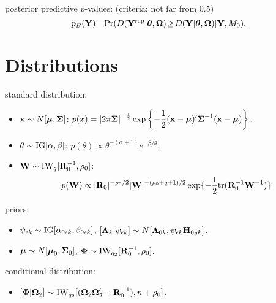 posterior predictive $p$-values: (criteria: not far from $0.5$)
\vspace{1ex}
\[p_B(\mathbf{Y}) \!=\! \text{Pr}(D(\mathbf{Y}^{\text{rep}} \vert \boldsymbol{\theta}, \boldsymbol{\Omega}) \!\geq\! D(\mathbf{Y} \vert \boldsymbol{\theta}, \boldsymbol{\Omega}) \vert \mathbf{Y}, M_0).\]







\section*{Distributions}

standard distribution: \begin{itemize}
    \item $\mathbf{x} \sim {N}[\boldsymbol{\mu}, \boldsymbol{\Sigma}]$: $
        \displaystyle p(x) = |2\pi\boldsymbol{\Sigma}|^{-\frac{1}{2}} \exp\left\{ -\frac{1}{2} (\mathbf{x} - \boldsymbol{\mu})' \boldsymbol{\Sigma}^{-1} (\mathbf{x} - \boldsymbol{\mu})\right\}.
    $
    \item $\theta \sim \text{IG}[\alpha, \beta]$: $p(\theta) \propto \theta^{-(\alpha + 1)} e^{-\beta/\theta}$.
    \item $\mathbf{W} \sim \text{IW}_q[\mathbf{R}_0^{-1}, \rho_0]$: 
        \[p(\mathbf{W}) \propto |\mathbf{R}_0|^{-\rho_0/2} |\mathbf{W}|^{-(\rho_0 + q + 1)/2} \exp\{-\frac{1}{2} \text{tr}(\mathbf{R}_0^{-1} \mathbf{W}^{-1})\}\]
\end{itemize}

priors: \begin{itemize}
    \item $\psi_{\epsilon k} \sim \text{IG}[\alpha_{0 \epsilon k}, \beta_{0 \epsilon k}]$, $[\boldsymbol{\Lambda}_k \vert \psi_{\epsilon k}] \sim {N}[\boldsymbol{\Lambda}_{0k}, \psi_{\epsilon k} \mathbf{H}_{0yk}]$.
    \item $\boldsymbol{\mu} \sim {N}[\boldsymbol{\mu}_0, \boldsymbol{\Sigma}_0]$, $\boldsymbol{\Phi} \sim \text{IW}_{q_2}[\mathbf{R}_0^{-1}, \rho_0]$.
\end{itemize}



conditional distribution: \begin{itemize}
    \item $[\boldsymbol{\Phi} \vert \boldsymbol{\Omega}_2] \sim \text{IW}_{q_2} [(\boldsymbol{\Omega}_2\boldsymbol{\Omega}_2' + \mathbf{R}_0^{-1}), n+\rho_0]$.
\end{itemize}








